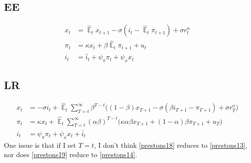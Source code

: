 \documentclass[11pt]{article}
\renewcommand{\[}{\begin{equation}}
\renewcommand{\]}{\end{equation}}
\DeclareMathOperator{\E}{\mathbb{E}}
\begin{document}
\subsection{EE}
\begin{align}
x_t &= \hat{\E}_t x_{t+1} - \sigma(i_t - \hat{\E}_t \pi_{t+1}) +\sigma r_t^n \tag{Preston, eq. (13)} \label{prestons13} \\
\pi_t &= \kappa x_t +\beta \hat{\E}_t \pi_{t+1} + u_t \tag{Preston, eq. (14)} \label{prestons14}  \\
i_t &= \bar{i}_t + \psi_{\pi}\pi_t + \psi_{x} x_t \tag{Preston, eq. (27) } 
\end{align}
\subsection{LR}
\begin{align}
x_t &=  -\sigma i_t +\hat{\E}_t \sum_{T=t}^{\infty} \beta^{T-t }\big( (1-\beta)x_{T+1} - \sigma(\beta i_{T+1} - \pi_{T+1}) +\sigma r_T^n \big) \tag{Preston, eq. (18)} \label{prestons18}  \\
\pi_t &= \kappa x_t +\hat{\E}_t \sum_{T=t}^{\infty} (\alpha\beta)^{T-t }\big( \kappa \alpha \beta x_{T+1} + (1-\alpha)\beta \pi_{T+1} + u_T\big)\tag{Preston, eq. (19)} \label{prestons19}  \\
i_t &= \psi_{\pi}\pi_t + \psi_{x} x_t + \bar{i}_t \tag{Preston, eq. (27)} 
\end{align}
One issue is that if I set $T=t$, I don't think \ref{prestons18} reduces to \ref{prestons13}, nor does \ref{prestons19} reduce to \ref{prestons14}.
\end{document}
